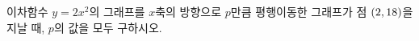 이차함수 $y=2x^2$의 그래프를 $x$축의 방향으로 $p$만큼 평행이동한 그래프가 점 $(2{,}\mkern3mu\mathopen{}18)$을 지날 때, $p$의 값을 모두 구하시오.
